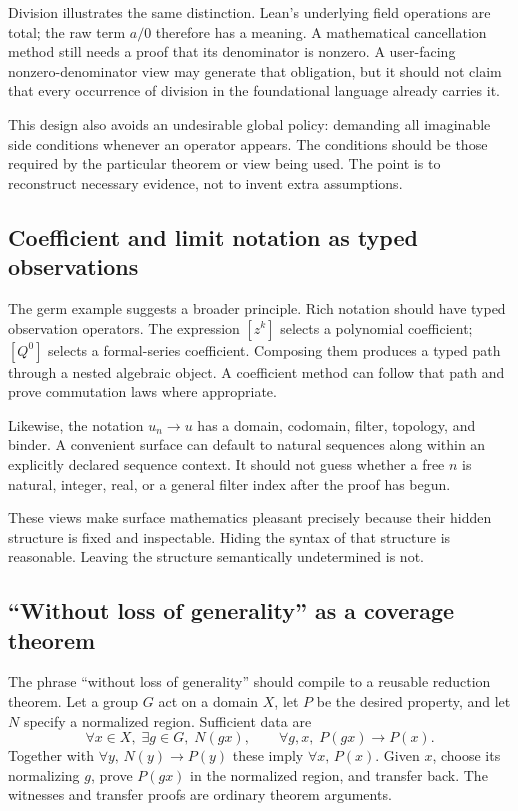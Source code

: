 \documentclass[11pt,letterpaper]{article}
\theoremstyle{definition}
\theoremstyle{remark}
\newcommand{\code}[1]{\texttt{\detokenize{#1}}}
\begin{document}
Division illustrates the same distinction. Lean's underlying field operations are total; the raw term $a/0$ therefore has a meaning. A mathematical cancellation method still needs a proof that its denominator is nonzero. A user-facing nonzero-denominator view may generate that obligation, but it should not claim that every occurrence of division in the foundational language already carries it.

This design also avoids an undesirable global policy: demanding all imaginable side conditions whenever an operator appears. The conditions should be those required by the particular theorem or view being used. The point is to reconstruct necessary evidence, not to invent extra assumptions.

\subsection{Coefficient and limit notation as typed observations}
The germ example suggests a broader principle. Rich notation should have typed observation operators. The expression $[z^k]$ selects a polynomial coefficient; $[Q^0]$ selects a formal-series coefficient. Composing them produces a typed path through a nested algebraic object. A coefficient method can follow that path and prove commutation laws where appropriate.

Likewise, the notation $u_n\to u$ has a domain, codomain, filter, topology, and binder. A convenient surface can default to natural sequences along \code{atTop} within an explicitly declared sequence context. It should not guess whether a free $n$ is natural, integer, real, or a general filter index after the proof has begun.

These views make surface mathematics pleasant precisely because their hidden structure is fixed and inspectable. Hiding the syntax of that structure is reasonable. Leaving the structure semantically undetermined is not.

\subsection{``Without loss of generality'' as a coverage theorem}
The phrase ``without loss of generality'' should compile to a reusable reduction theorem. Let a group $G$ act on a domain $X$, let $P$ be the desired property, and let $N$ specify a normalized region. Sufficient data are
\[
 \forall x\in X,\;\exists g\in G,\;N(gx),
 \qquad
 \forall g,x,\;P(gx)\to P(x).
\]
Together with $\forall y,\,N(y)\to P(y)$ these imply $\forall x,\,P(x)$. Given $x$, choose its normalizing $g$, prove $P(gx)$ in the normalized region, and transfer back. The witnesses and transfer proofs are ordinary theorem arguments.
\end{document}
